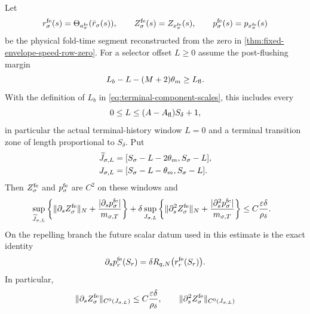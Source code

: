 \begin{theorem}
Let
\begin{equation}
 r_\sigma^{\rm fe}(s)
 =\Theta_{a_\sigma^{\rm fe}}(\bar r_\sigma(s)),\qquad
 Z_\sigma^{\rm fe}(s)=Z_{x_\sigma^{\rm fe}}(s),\qquad
 p_\sigma^{\rm fe}(s)=p_{x_\sigma^{\rm fe}}(s)             \label{eq:fixed-envelope-physical-terminal-fields}
\end{equation}
be the physical fold-time segment reconstructed from the zero in
\cref{thm:fixed-envelope-speed-row-zero}.  For a selector offset \(L\ge0\)
assume the post-flushing margin
\begin{equation}
 L_b-L-(M+2)\theta_m\ge L_{\rm fl}.             \label{eq:terminal-slow-jet-selector-margin}
\end{equation}
With the definition of \(L_b\) in
\cref{eq:terminal-component-scales}, this includes every
\begin{equation}
 0\le L\le (A-A_{\rm fl})S_\delta+1,             \label{eq:terminal-slow-jet-offset-range}
\end{equation}
in particular the actual terminal-history window \(L=0\) and a terminal
transition zone of length proportional to \(S_\delta\).  Put
\begin{align}
 \widetilde J_{\sigma,L}
 &=[S_\sigma-L-2\theta_m,S_\sigma-L],\notag\\
 J_{\sigma,L}
 &=[S_\sigma-L-\theta_m,S_\sigma-L].             \label{eq:terminal-slow-jet-windows}
\end{align}
Then \(Z_\sigma^{\rm fe}\) and \(p_\sigma^{\rm fe}\) are \(C^2\) on
these windows and
\begin{align}
 &\sup_{\widetilde J_{\sigma,L}}
   \left\{\|\partial_sZ_\sigma^{\rm fe}\|_N
       +\frac{|\partial_sp_\sigma^{\rm fe}|}{m_{\sigma,T}}\right\}
 +\delta\sup_{J_{\sigma,L}}
   \left\{\|\partial_s^2Z_\sigma^{\rm fe}\|_N
       +\frac{|\partial_s^2p_\sigma^{\rm fe}|}{m_{\sigma,T}}\right\}
 \le C\frac{\varepsilon\delta}{\rho_\delta}.    \label{eq:terminal-tangent-component-bound}
\end{align}
On the repelling branch the future scalar datum used in this estimate is
the exact identity
\begin{equation}
 \partial_sp_r^{\rm fe}(S_r)
 =\delta R_{q,N}\bigl(r_r^{\rm fe}(S_r)\bigr).   \label{eq:terminal-tangent-future-row}
\end{equation}
In particular,
\begin{equation}
 \|\partial_sZ_\sigma^{\rm fe}\|_{C^0(J_{\sigma,L})}
 \le C\frac{\varepsilon\delta}{\rho_\delta},
 \qquad
 \|\partial_s^2Z_\sigma^{\rm fe}\|_{C^0(J_{\sigma,L})}

\end{equation}
\end{theorem}
